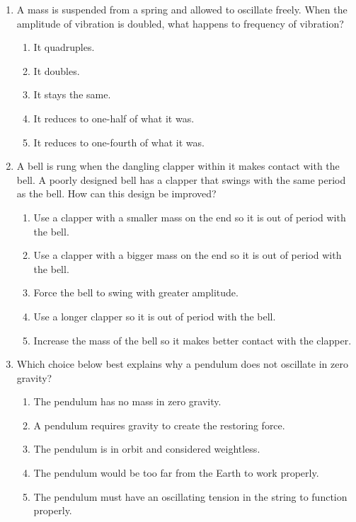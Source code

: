 \documentclass{../../../oss-classkick}
\begin{document}
\begin{multicols}{2}
\begin{enumerate}[leftmargin=18pt]
  \item A mass is suspended from a spring and allowed to oscillate freely. When
    the amplitude of vibration is doubled, what happens to frequency of
    vibration?
    \begin{enumerate}[nosep,leftmargin=18pt,label=(\Alph*)]
    \item It quadruples.
    \item It doubles.
    \item It stays the same.
    \item It reduces to one-half of what it was.
    \item It reduces to one-fourth of what it was.
    \end{enumerate}
    \vspace{.7in}
    
  \item A bell is rung when the dangling clapper within it makes contact with
    the bell. A poorly designed bell has a clapper that swings with the same
    period as the bell. How can this design be improved?
    \begin{enumerate}[nosep,leftmargin=18pt,label=(\Alph*)]
    \item Use a clapper with a smaller mass on the end so it is out of period
      with the bell.
    \item Use a clapper with a bigger mass on the end so it is out of period
      with the bell.
    \item Force the bell to swing with greater amplitude.
    \item Use a longer clapper so it is out of period with the bell.
    \item Increase the mass of the bell so it makes better contact with the
      clapper.
    \end{enumerate}
    \columnbreak
    
  \item Which choice below best explains why a pendulum does not oscillate
    in zero gravity?
    \begin{enumerate}[nosep,leftmargin=18pt,label=(\Alph*)]
    \item The pendulum has no mass in zero gravity.
    \item A pendulum requires gravity to create the restoring force.
    \item The pendulum is in orbit and considered weightless.
    \item The pendulum would be too far from the Earth to work properly.
    \item The pendulum must have an oscillating tension in the string to
      function properly.
    \end{enumerate}
    \vspace{.7in}
    

\end{enumerate}
\end{multicols}
\end{document}
